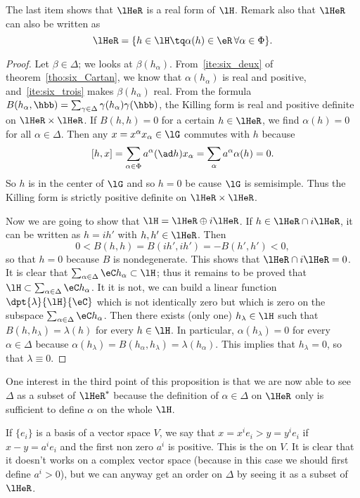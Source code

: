 The last item shows that $\lHeR$ is a real form of $\lH$. Remark also that $\lHeR$ can also be written as
\[
	\lHeR=\{h\in\lH\tq \alpha(h)\in\eR\,\forall\alpha\in\Phi \}.
\]
\begin{proof}
	Let $\beta\in\Delta$; we looks at $\beta( h_{\alpha})$. From~\ref{ite:six_deux} of theorem~\ref{tho:six_Cartan}, we know that $\alpha( h_{\alpha})$ is real and positive, and~\ref{ite:six_trois} makes $\beta( h_{\alpha})$ real. From the formula $B( h_{\alpha},\hbb)=\sum_{\gamma\in\Delta}\gamma( h_{\alpha})\gamma(\hbb)$, the Killing form is real and positive definite on $\lHeR\times\lHeR$. If $B(h,h)=0$ for a certain $h\in\lHeR$, we find $\alpha(h)=0$ for all $\alpha\in\Delta$. Then any $x=x^{\alpha} x_{\alpha}\in\lG$ commutes with $h$ because
	\[
		[h,x]=\sum_{\alpha\in\Phi}a^{\alpha}(\ad h) x_{\alpha}=\sum_{\alpha}a^{\alpha}\alpha(h)=0.
	\]
	So $h$ is in the center of $\lG$ and so $h=0$ be cause $\lG$ is semisimple. Thus the Killing form is strictly positive definite on $\lHeR\times\lHeR$.

	Now we are going to show that $\lH=\lHeR\oplus i\lHeR$. If $h\in\lHeR\cap i\lHeR$, it can be written as $h=ih'$ with $h,h'\in\lHeR$. Then
	\[
		0<B(h,h)=B(ih',ih')=-B(h',h')<0,
	\]
	so that $h=0$ because $B$ is nondegenerate. This shows that $\lHeR\cap i\lHeR=0$. It is clear that $\sum_{\alpha\in\Delta}\eC h_{\alpha}\subset\lH$; thus it remains to be proved that $\lH\subset\sum_{\alpha\in\Delta}\eC h_{\alpha}$. It it is not, we can build a linear function $\dpt{\lambda}{\lH}{\eC}$ which is not identically zero but which is zero on the subspace $\sum_{\alpha\in\Delta}\eC h_{\alpha}$. Then there exists (only one) $h_{\lambda}\in\lH$ such that $B(h,h_{\lambda})=\lambda(h)$ for every $h\in\lH$. In particular, $\alpha(h_{\lambda})=0$ for every $\alpha\in\Delta$ because $\alpha(h_{\lambda})=B( h_{\alpha},h_{\lambda})=\lambda( h_{\alpha})$. This implies that $h_{\lambda}=0$, so that $\lambda\equiv 0$.

\end{proof}

One interest in the third point of this proposition is that we are now able to see $\Delta$ as a subset of $\lHeR^*$ because the definition of $\alpha\in\Delta$ on $\lHeR$ only is sufficient to define $\alpha$ on the whole $\lH$.

If $\{e_i\}$ is a basis of a vector space $V$, we say that $x=x^ie_i>y=y^ie_i$ if $x-y=a^ie_i$ and the first non zero $a^i$ is positive. This is the  on $V$. It is clear that it doesn't works on a complex vector space (because in this case we should first define $a^i>0$), but we can anyway get an order on $\Delta$ by seeing it as a subset of $\lHeR$.

